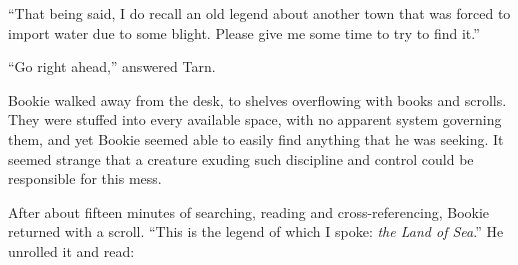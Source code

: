 ``That being said, I do recall an old legend about another town that was forced to import water due to some blight.  Please give me some time to try to find it.''

``Go right ahead,'' answered Tarn.

Bookie walked away from the desk, to shelves overflowing with books and scrolls.  They were stuffed into every available space, with no apparent system governing them, and yet Bookie seemed able to easily find anything that he was seeking.  It seemed strange that a creature exuding such discipline and control could be responsible for this mess.

After about fifteen minutes of searching, reading and cross-referencing, Bookie returned with a scroll.  ``This is the legend of which I spoke: \emph{the Land of Sea}.''  He unrolled it and read:

